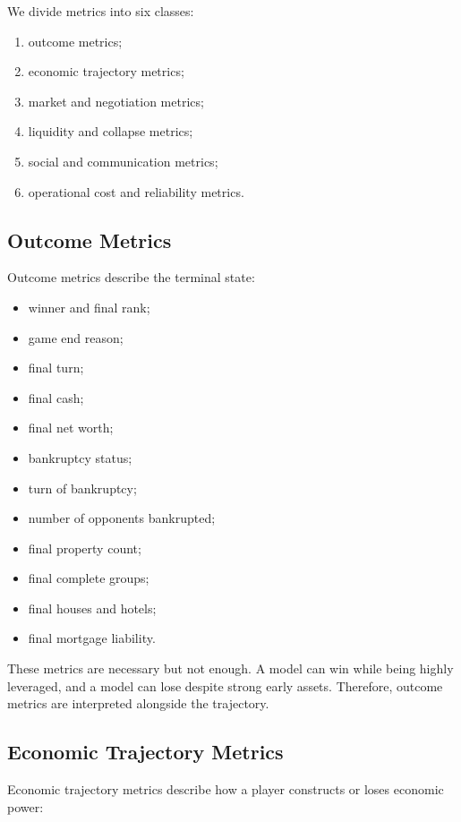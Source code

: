 \documentclass[conference]{IEEEtran}
\begin{document}
We divide metrics into six classes:

\begin{enumerate}
    \item outcome metrics;
    \item economic trajectory metrics;
    \item market and negotiation metrics;
    \item liquidity and collapse metrics;
    \item social and communication metrics;
    \item operational cost and reliability metrics.
\end{enumerate}

\subsection{Outcome Metrics}

Outcome metrics describe the terminal state:

\begin{itemize}
    \item winner and final rank;
    \item game end reason;
    \item final turn;
    \item final cash;
    \item final net worth;
    \item bankruptcy status;
    \item turn of bankruptcy;
    \item number of opponents bankrupted;
    \item final property count;
    \item final complete groups;
    \item final houses and hotels;
    \item final mortgage liability.
\end{itemize}

These metrics are necessary but not enough. A model can win while being highly leveraged, and a model can lose despite strong early assets. Therefore, outcome metrics are interpreted alongside the trajectory.

\subsection{Economic Trajectory Metrics}

Economic trajectory metrics describe how a player constructs or loses economic power:
\end{document}
